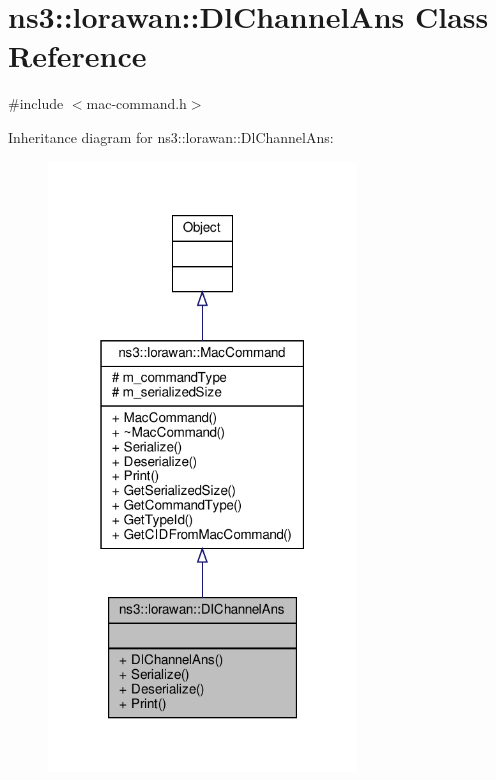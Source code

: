\hypertarget{classns3_1_1lorawan_1_1DlChannelAns}{}\section{ns3\+:\+:lorawan\+:\+:Dl\+Channel\+Ans Class Reference}
\label{classns3_1_1lorawan_1_1DlChannelAns}


{\ttfamily \#include $<$mac-\/command.\+h$>$}



Inheritance diagram for ns3\+:\+:lorawan\+:\+:Dl\+Channel\+Ans\+:
\nopagebreak
\begin{figure}[H]
\begin{center}
\leavevmode
\includegraphics[width=232pt]{classns3_1_1lorawan_1_1DlChannelAns__inherit__graph}
\end{center}
\end{figure}


